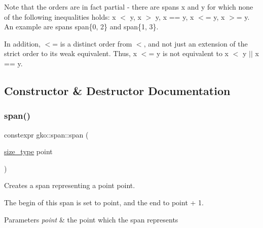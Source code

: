 Note that the orders are in fact partial -\/ there are spans {\ttfamily x} and {\ttfamily y} for which none of the following inequalities holds\+: {\ttfamily x $<$ y}, {\ttfamily x $>$ y}, {\ttfamily x == y}, {\ttfamily x $<$= y}, {\ttfamily x $>$= y}. An example are spans {\ttfamily span\{0, 2\}} and {\ttfamily span\{1, 3\}}.

In addition, {\ttfamily $<$=} is a distinct order from {\ttfamily $<$}, and not just an extension of the strict order to its weak equivalent. Thus, {\ttfamily x $<$= y} is not equivalent to {\ttfamily x $<$ y $\vert$$\vert$ x == y}. 

\subsection{Constructor \& Destructor Documentation}
\mbox{\label{structgko_1_1span_a2aafb0414ef14fac91296066f7426d6d}} 
\subsubsection{\texorpdfstring{span()}{span()}\hspace{0.1cm}{\footnotesize\ttfamily [1/2]}}
{\footnotesize\ttfamily constexpr gko\+::span\+::span (\begin{DoxyParamCaption}\item[{\hyperlink{namespacegko_a6e5c95df0ae4e47aab2f604a22d98ee7}{size\+\_\+type}}]{point }\end{DoxyParamCaption})\hspace{0.3cm}{\ttfamily [noexcept]}}



Creates a span representing a point {\ttfamily point}. 

The {\ttfamily begin} of this span is set to {\ttfamily point}, and the {\ttfamily end} to {\ttfamily point + 1}.


\begin{DoxyParams}{Parameters}
{\em point} & the point which the span represents \\
\hline
\end{DoxyParams}
\mbox{\label{structgko_1_1span_a1566e1ab67312a6b9ece66fa4f5c8799}} 
